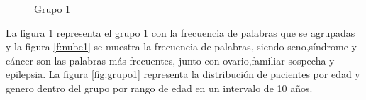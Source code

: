 \begin{figure}[h!]
	\centering
	\caption{Grupo 1}
	\label{f:grupo11}
\end{figure} 


La figura \ref{f:grupo11} representa el grupo 1 con la frecuencia de palabras que se agrupadas y la figura \ref{f:nube1}  se muestra la frecuencia de palabras, siendo seno,síndrome y cáncer son las palabras más frecuentes, junto con ovario,familiar sospecha y epilepsia. La figura \ref{fig:grupo1} representa la distribución de pacientes por edad y genero dentro del grupo por rango de edad en un intervalo de 10 años.\\

